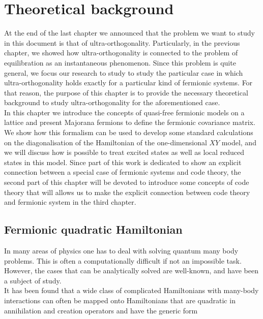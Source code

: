 \chapter{ Theoretical background }
At the end of the last chapter we announced that the problem we want to study in this document is that of ultra-orthogonality. Particularly, in the previous chapter, we showed how ultra-orthogonality is connected to the problem of equilibration as an instantaneous phenomenon. Since this problem is quite general, we focus our research to study to study the particular case in which ultra-orthogonality holds exactly for a particular kind of fermionic systems. For that reason, the purpose of this chapter is to provide the necessary theoretical background to study ultra-orthogonality for the aforementioned case.\\

\indent In this chapter we introduce the concepts of quasi-free fermionic models on a lattice and present Majorana fermions to define the fermionic covariance matrix. We show how this formalism can be used to develop some standard calculations on the diagonalisation of the Hamiltonian of the one-dimensional $XY$ model, and we will discuss how is possible to treat excited states as well as local reduced states in this model. Since part of this work is dedicated to show an explicit connection between a special case of fermionic systems and code theory, the second part of this chapter will be devoted to introduce some concepts of code theory that will allows us to make the explicit connection between code theory and fermionic system in the third chapter.

\section{Fermionic quadratic Hamiltonian}
In many areas of physics one has to deal with solving quantum many body problems. This is often a computationally difficult if not an impossible task. However, the cases that can be analytically solved are well-known, and have been a subject of study\cite{noauthor_density_2007,niu_majorana_2012,reyes-lega_aspects_2016,chung_density-matrix_2001,leijnse_introduction_2012, molinari_notes_2017,botero_bcs-like_2004, bravyi_lagrangian_2004, lieb_two_1961, latorre_ground_2004, katsura_statistical_1962, barouch_statistical_1971, barouch_statistical_1970}.\\
\indent It has been found that a wide class of complicated Hamiltonians with many-body interactions can often be mapped onto Hamiltonians that are quadratic in annihilation and creation operators and have the generic form \cite{botero_bcs-like_2004}

